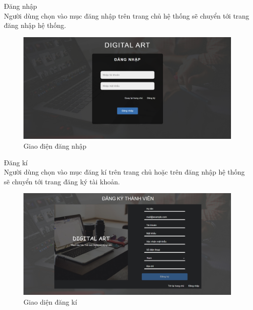 \documentclass{article}
\begin{document}
{{{{{{{{{{{{{{{{{{\begin{center}
\begin{figure}[htp]
		\end{figure}
	\end{center}
}
\newpage
\indent	Đăng nhập\\
{\large
	Người dùng chọn vào mục đăng nhập trên trang chủ hệ thống sẽ chuyển tới trang đăng nhập hệ thống.}
	\begin{center}
		\begin{figure}[htp]
			\begin{center}
				\includegraphics[scale=.350]{anh31.png}
			\end{center}
			\caption{Giao điện đăng nhập}
			
		\end{figure}
	\end{center}
}
\newpage
{\large 
	\indent	Đăng kí\\
	{\large
		Người dùng chọn vào mục đăng kí trên trang chủ hoặc trên đăng nhập hệ thống sẽ chuyển tới trang đăng ký tài khoản.}
	\begin{center}
		\begin{figure}[htp]
			\begin{center}
				\includegraphics[scale=.350]{anh32.png}
			\end{center}
			\caption{Giao diện đăng kí}
			

\end{figure}
\end{center}}}}}}}}}}}}}}}}}}
\end{document}
